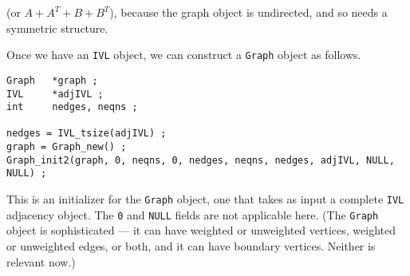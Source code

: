 (or $A + A^T + B + B^T$), because the graph object is undirected,
and so needs a symmetric structure.
\par
Once we have an {\tt IVL} object, we can construct a {\tt Graph}
object as follows.
\begin{verbatim}
Graph   *graph ;
IVL     *adjIVL ;
int     nedges, neqns ;

nedges = IVL_tsize(adjIVL) ;
graph = Graph_new() ;
Graph_init2(graph, 0, neqns, 0, nedges, neqns, nedges, adjIVL, NULL, NULL) ;
\end{verbatim}
This is an initializer for the {\tt Graph} object, one that
takes as input a complete {\tt IVL} adjacency object.
The {\tt 0} and {\tt NULL} fields are not applicable here.
(The {\tt Graph} object is sophisticated --- it can have weighted or
unweighted vertices, weighted or unweighted edges, or both, and it
can have boundary vertices. Neither is relevant now.)
\par
